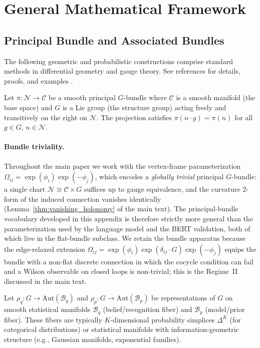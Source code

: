 \documentclass[twoside,11pt]{article}
\begin{document}
\section{General Mathematical Framework}
\subsection{Principal Bundle and Associated Bundles}

The following geometric and probabilistic constructions comprise standard methods in differential geometry and gauge theory. See references for details, proofs, and examples \citep{nakahara2003geometry,frankel2011geometry,Blei2017,Amari2016}.

Let $\pi: \mathcal{N} \to \mathcal{C}$ be a smooth principal $G$-bundle where $\mathcal{C}$ is a smooth manifold (the base space) and $G$ is a Lie group (the structure group) acting freely and transitively on the right on $\mathcal{N}$. The projection satisfies $\pi(n \cdot g) = \pi(n)$ for all $g \in G$, $n \in \mathcal{N}$.

\paragraph{Bundle triviality.} Throughout the main paper we work with the vertex-frame parameterization $\Omega_{ij} = \exp(\phi_i)\exp(-\phi_j)$, which encodes a \emph{globally trivial} principal $G$-bundle: a single chart $\mathcal{N} \cong \mathcal{C} \times G$ suffices up to gauge equivalence, and the curvature 2-form of the induced connection vanishes identically (Lemma~\ref{thm:vanishing_holonomy} of the main text). The principal-bundle vocabulary developed in this appendix is therefore strictly more general than the parameterization used by the language model and the BERT validation, both of which live in the flat-bundle subclass. We retain the bundle apparatus because the edge-relaxed extension $\Omega_{ij} = \exp(\phi_i)\exp(\delta_{ij}\cdot G)\exp(-\phi_j)$ equips the bundle with a non-flat discrete connection in which the cocycle condition can fail and a Wilson observable on closed loops is non-trivial; this is the Regime~II discussed in the main text.

Let $\rho_q: G \to \text{Aut}(\mathcal{B}_q)$ and $\rho_p: G \to \text{Aut}(\mathcal{B}_p)$ be representations of $G$ on smooth statistical manifolds $\mathcal{B}_q$ (belief/recognition fiber) and $\mathcal{B}_p$ (model/prior fiber). These fibers are typically $K$-dimensional probability simplices $\Delta^K$ (for categorical distributions) or statistical manifolds with information-geometric structure (e.g., Gaussian manifolds, exponential families).
\end{document}
